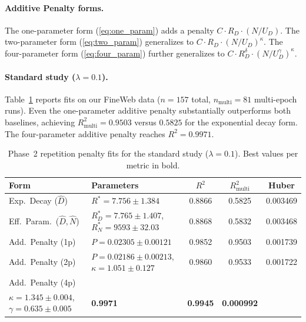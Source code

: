 \paragraph{Additive Penalty forms.}
The one-parameter form (\autoref{eq:one_param}) adds a penalty $C \cdot R_D \cdot (N / U_D)$.
The two-parameter form (\autoref{eq:two_param}) generalizes to $C \cdot R_D \cdot (N / U_D)^\kappa$.
The four-parameter form (\autoref{eq:four_param}) further generalizes to $C \cdot R_D^\delta \cdot (N / U_D^\gamma)^\kappa$.

\paragraph{Standard study ($\lambda = 0.1$).}
Table~\ref{tab:phase2_standard} reports fits on our FineWeb data ($n = 157$ total, $n_{\text{multi}} = 81$ multi-epoch runs).
Even the one-parameter additive penalty substantially outperforms both baselines, achieving $R^2_{\text{multi}} = 0.9503$ versus $0.5825$ for the exponential decay form.
The four-parameter additive penalty reaches $R^2 = 0.9971$.

\begin{table}[t]
\centering
\caption{Phase~2 repetition penalty fits for the standard study ($\lambda = 0.1$). Best values per metric in bold.}
\label{tab:phase2_standard}
\small
\begin{tabular}{llccc}
\toprule
Form & Parameters & $R^2$ & $R^2_{\text{multi}}$ & Huber \\
\midrule
Exp.\ Decay ($\widehat{D}$) & $R^* = 7.756 \pm 1.384$ & 0.8866 & 0.5825 & 0.003469 \\
Eff.\ Param.\ ($\widehat{D}, \widehat{N}$) & $R^*_D = 7.765 \pm 1.407$, $R^*_N = 9593 \pm 32.03$ & 0.8868 & 0.5832 & 0.003468 \\
\midrule
Add.\ Penalty (1p) & $P = 0.02305 \pm 0.00121$ & 0.9852 & 0.9503 & 0.001739 \\
Add.\ Penalty (2p) & $P = 0.02186 \pm 0.00213$, $\kappa = 1.051 \pm 0.127$ & 0.9860 & 0.9533 & 0.001722 \\
Add.\ Penalty (4p) & \makecell[l]{$P = 3.27 \times 10^{-7} \pm 5.27 \times 10^{-11}$, $\delta = 1.674 \pm 0.002$, \\ $\kappa = 1.345 \pm 0.004$, $\gamma = 0.635 \pm 0.005$} & \textbf{0.9971} & \textbf{0.9945} & \textbf{0.000992} \\
\bottomrule
\end{tabular}
\end{table}

